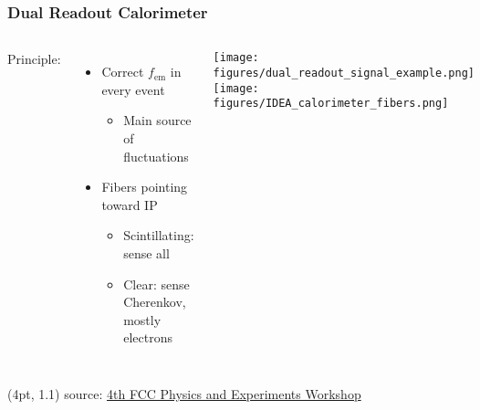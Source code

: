 \documentclass[aspectratio=169]{beamer}
\newcommand{\bluetext}[1]{%
  \textcolor{myBlue}{#1}
}
\begin{document}
\begin{frame}
  \frametitle{Dual Readout Calorimeter}

  \begin{columns}[c]
    \bluetext{Principle:}
    \begin{itemize}
      \item Correct $f_\text{em}$ in every event
            \begin{itemize}
              \item Main source of fluctuations
            \end{itemize}
      \item Fibers pointing toward IP
            \begin{itemize}
              \item \bluetext{Scintillating:} sense all
              \item \bluetext{Clear:} sense Cherenkov, mostly electrons
            \end{itemize}
    \end{itemize}

    \begin{center}
      \texttt{[image: figures/dual\_readout\_signal\_example.png]}
      \texttt{[image: figures/IDEA\_calorimeter\_fibers.png]}
    \end{center}
  \end{columns}

  \begin{textblock*}{\paperwidth}(4pt, 1.1\textheight)
    \tiny source:
    \href{https://indico.cern.ch/event/932973/}
         {4th FCC Physics and Experiments Workshop}
  \end{textblock*}
\end{frame}
\end{document}

